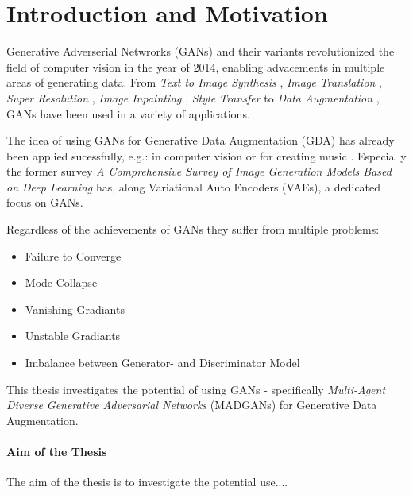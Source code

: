 \section{Introduction and Motivation}\label{introduction_and_motivation}
\pagestyle{fancy}
Generative Adverserial Netwrorks (GANs) \cite{goodfellow2014generativeadversarialnetworks} and their variants revolutionized the field of computer vision in the year of 2014, enabling advacements in multiple areas of generating data. From \textit{Text to Image Synthesis} \cite{reed2016generativeadversarialtextimage}, \textit{Image Translation} \cite{isola2018imagetoimagetranslationconditionaladversarial}, \textit{Super Resolution} \cite{ledig2017photorealisticsingleimagesuperresolution}, \textit{Image Inpainting} \cite{pathak2016contextencodersfeaturelearning}, \textit{Style Transfer} \cite{wang2023multimodalityguidedimagestyletransfer} to \textit{Data Augmentation} \cite{shorten2019survey}, GANs have been used in a variety of applications.

The idea of using GANs for Generative Data Augmentation (GDA) has already been applied sucessfully, e.g.: in computer vision \cite{Li2025comprehensivesurvedeepimages} or for creating music \cite{ji2020comprehensivesurveydeepmusic}. Especially the former survey \textit{A Comprehensive Survey of Image Generation Models Based on Deep Learning} has, along Variational Auto Encoders (VAEs), a dedicated focus on GANs.

Regardless of the achievements of GANs they suffer from multiple problems:

\begin{itemize}
    \setlength{\itemsep}{-3pt}
    \item Failure to Converge
    \item Mode Collapse
    \item Vanishing Gradiants
    \item Unstable Gradiants
    \item Imbalance between Generator- and Discriminator Model
\end{itemize}


This thesis investigates the potential of using GANs - specifically \textit{Multi-Agent Diverse Generative Adversarial Networks} (MADGANs) \cite{ghosh2018multiagentdiversegenerativeadversarial} for Generative Data Augmentation.

\paragraph{Aim of the Thesis}\label{aim_of_the_thesis}
The aim of the thesis is to investigate the potential use....


\newpage
